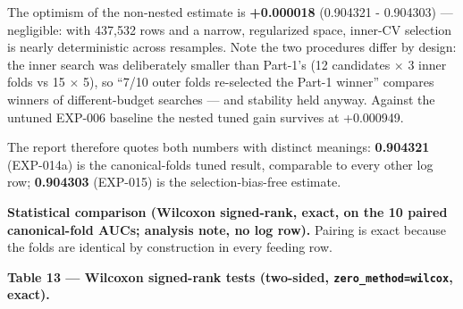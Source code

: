 \documentclass[11pt,a4paper]{article}
\begin{document}
The optimism of the non-nested estimate is \textbf{+0.000018} (0.904321
- 0.904303) --- negligible: with 437,532 rows and a narrow, regularized
space, inner-CV selection is nearly deterministic across resamples. Note
the two procedures differ by design: the inner search was deliberately
smaller than Part-1's (12 candidates $\times$ 3 inner folds vs 15 $\times$ 5), so
``7/10 outer folds re-selected the Part-1 winner'' compares winners of
different-budget searches --- and stability held anyway. Against the
untuned EXP-006 baseline the nested tuned gain survives at +0.000949.

The report therefore quotes both numbers with distinct meanings:
\textbf{0.904321} (EXP-014a) is the canonical-folds tuned result,
comparable to every other log row; \textbf{0.904303} (EXP-015) is the
selection-bias-free estimate.

\textbf{Statistical comparison (Wilcoxon signed-rank, exact, on the 10
paired canonical-fold AUCs; analysis note, no log row).} Pairing is
exact because the folds are identical by construction in every feeding
row.

\textbf{Table 13 --- Wilcoxon signed-rank tests (two-sided,
\texttt{zero\_method=\textquotesingle{}wilcox\textquotesingle{}},
exact).}
\end{document}
